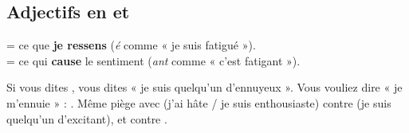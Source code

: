 \subsection{Adjectifs en  et }
\begin{regle}
 = ce que \textbf{je ressens} (\emph{é} comme « je suis fatigué »).\\
 = ce qui \textbf{cause} le sentiment (\emph{ant} comme « c'est fatigant »).
\end{regle}

\begin{piege}[\en{*I am boring}]
Si vous dites , vous dites « je suis quelqu'un d'ennuyeux ». Vous vouliez
dire « je m'ennuie » : . Même piège avec  (j'ai hâte / je suis
enthousiaste) contre  (je suis quelqu'un d'excitant), et
 contre .
\end{piege}

